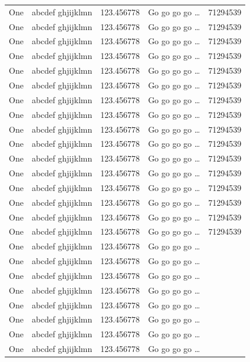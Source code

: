 \documentclass[phd,showframe]{ndsu-thesis-2022}
\begin{document}
\begin{longtable}{l l l l r}
One & abcdef ghjijklmn & 123.456778  & Go go go go \ldots & \num{71294539}\\
One & abcdef ghjijklmn & 123.456778  & Go go go go \ldots & \num{71294539}\\
One & abcdef ghjijklmn & 123.456778  & Go go go go \ldots & \num{71294539}\\
One & abcdef ghjijklmn & 123.456778  & Go go go go \ldots & \num{71294539}\\
One & abcdef ghjijklmn & 123.456778  & Go go go go \ldots & \num{71294539}\\
One & abcdef ghjijklmn & 123.456778  & Go go go go \ldots & \num{71294539}\\
One & abcdef ghjijklmn & 123.456778  & Go go go go \ldots & \num{71294539}\\
One & abcdef ghjijklmn & 123.456778  & Go go go go \ldots & \num{71294539}\\
One & abcdef ghjijklmn & 123.456778  & Go go go go \ldots & \num{71294539}\\
One & abcdef ghjijklmn & 123.456778  & Go go go go \ldots & \num{71294539}\\
One & abcdef ghjijklmn & 123.456778  & Go go go go \ldots & \num{71294539}\\
One & abcdef ghjijklmn & 123.456778  & Go go go go \ldots & \num{71294539}\\
One & abcdef ghjijklmn & 123.456778  & Go go go go \ldots & \num{71294539}\\
One & abcdef ghjijklmn & 123.456778  & Go go go go \ldots & \num{71294539}\\
One & abcdef ghjijklmn & 123.456778  & Go go go go \ldots & \num{71294539}\\
One & abcdef ghjijklmn & 123.456778  & Go go go go \ldots & \num{71294539}\\
One & abcdef ghjijklmn & 123.456778  & Go go go go \ldots \\
One & abcdef ghjijklmn & 123.456778  & Go go go go \ldots \\
One & abcdef ghjijklmn & 123.456778  & Go go go go \ldots \\
One & abcdef ghjijklmn & 123.456778  & Go go go go \ldots \\
One & abcdef ghjijklmn & 123.456778  & Go go go go \ldots \\
One & abcdef ghjijklmn & 123.456778  & Go go go go \ldots \\
One & abcdef ghjijklmn & 123.456778  & Go go go go \ldots \\
One & abcdef ghjijklmn & 123.456778  & Go go go go \ldots \\

\end{longtable}
\end{document}
